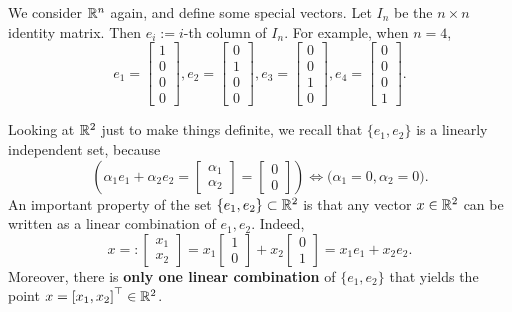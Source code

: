 \begin{figure}[!hb]
{    }
    \label{fig:R2BasisVectorsNotOrthognal}
\end{figure}


We consider $\mathbb R^n$ again, and define some special vectors. 
Let $I_n$ be the $n \times n$ identity matrix. Then $e_i:= i$-th column of $I_n$. For example, when $n=4$,
$$e_1 = \left[\begin{array}{c}  1 \\ 0 \\ 0 \\ 0\end{array} \right], 
e_2 = \left[\begin{array}{c}  0 \\ 1 \\ 0 \\0  \end{array} \right],
e_3 = \left[\begin{array}{c}  0 \\ 0 \\ 1 \\0  \end{array} \right],
e_4 = \left[\begin{array}{c}  0 \\ 0 \\ 0 \\1  \end{array} \right].$$

Looking at $\mathbb R^2$ just to make things definite, we recall that $\{e_1, e_2\}$ is a linearly independent set, because
\begin{equation}
\label{eq:R4ExampleBasis_a}
    \left( \alpha_1 e_1 + \alpha_2 e_2 =  \left[\begin{array}{c}  \alpha_1 \\ \alpha_2 \end{array} \right] = \left[\begin{array}{c}  0 \\ 0 \end{array} \right] \right) \iff \Big( \alpha_1=0, \alpha_2 = 0 \Big).
    \end{equation}
An important property of the set $\{e_1, e_2\} \subset \mathbb R^2$ is that any vector $x\in \mathbb R^2$ can be written as a linear combination of $e_1, e_2$. Indeed, 
\begin{equation}
\label{eq:R4ExampleBasis_b}
x=:\left[\begin{array}{c}  x_1 \\ x_2 \end{array} \right] = x_1 \left[\begin{array}{c}  1 \\ 0 \end{array} \right] + x_2 \left[\begin{array}{c}  0 \\ 1 \end{array} \right]= x_1 e_1 + x_2 e_2. 
    \end{equation}
Moreover, there is \textbf{only one linear combination} of  $\{e_1, e_2\}$ that yields the point $x = \left[x_1, x_2 \right]^\top \in \mathbb R^2$.







